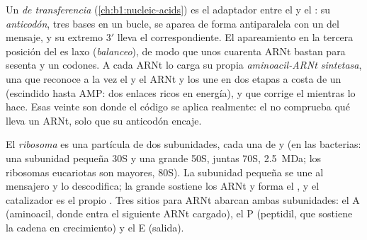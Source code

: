\begin{definition}\label{def:b1:gene-expression:trna}
Un \emph{ de transferencia} (\cref{ch:b1:nucleic-acids}) es el adaptador
entre el  y el : su \emph{anticodón}, tres bases en un bucle,
se aparea de forma antiparalela con un  del mensaje, y su extremo $3'$
lleva el  correspondiente. El apareamiento en la tercera posición
del  es laxo (\emph{balanceo}), de modo que unos cuarenta ARNt bastan
para sesenta y un codones. A cada ARNt lo carga su propia
\emph{aminoacil-ARNt sintetasa}, una  que reconoce a la vez el
 y el ARNt y los une en dos etapas a costa de un  (escindido
hasta AMP: dos enlaces ricos en energía), y que corrige el 
mientras lo hace. Esas veinte  son donde el código se aplica
realmente: el  no comprueba qué  lleva un ARNt, solo que
su anticodón encaje.
\end{definition}

\begin{definition}[El ribosoma]\label{def:b1:gene-expression:ribosome}
El \emph{ribosoma} es una partícula de dos subunidades, cada una de  y  (en las bacterias: una subunidad pequeña 30S y una
grande 50S, juntas 70S, \qty{2.5}{MDa}; los ribosomas eucariotas son
mayores, 80S). La subunidad pequeña se une al mensajero y lo descodifica; la
grande sostiene los ARNt y forma el , y el catalizador es el
propio . Tres sitios para ARNt abarcan ambas subunidades: el A
(aminoacil, donde entra el siguiente ARNt cargado), el P (peptidil, que
sostiene la cadena en crecimiento) y el E (salida).
\end{definition}

